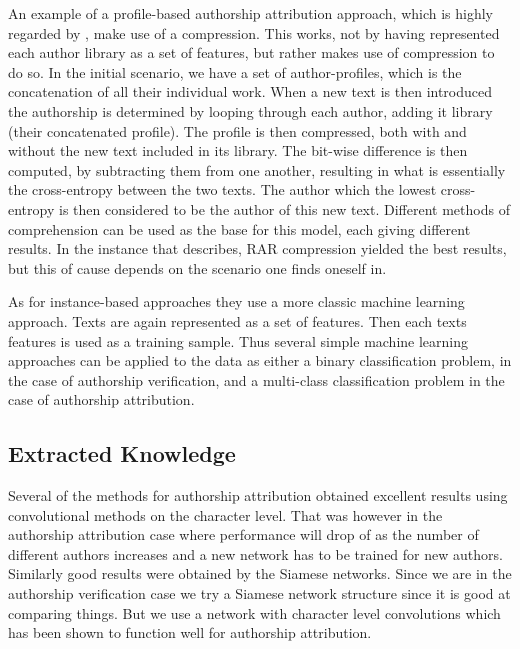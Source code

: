 An example of a profile-based authorship attribution approach, which is highly
regarded by \cite{stamatos2009}, make use of a compression. This works, not
by having represented each author library as a set of features, but rather
makes use of compression to do so. In the initial scenario, we have a set of
author-profiles, which is the concatenation of all their individual work.
When a new text is then introduced the authorship is determined by looping
through each author, adding it library (their concatenated profile). The
profile is then compressed, both with and without the new text included in its
library. The bit-wise difference is then computed, by subtracting them from
one another, resulting in what is essentially the cross-entropy between the
two texts. The author which the lowest cross-entropy is then considered to be
the author of this new text. Different methods of comprehension can be used as
the base for this model, each giving different results. In the instance that
\cite{stamatos2009} describes, RAR compression yielded the best results, but
this of cause depends on the scenario one finds oneself in.

As for instance-based approaches they use a more classic machine learning
approach. Texts are again represented as a set of features. Then each texts
features is used as a training sample. Thus several simple machine learning
approaches can be applied to the data as either a binary classification problem,
in the case of authorship verification, and a multi-class classification problem
in the case of authorship attribution.


\subsection{Extracted Knowledge}

Several of the methods for authorship attribution obtained excellent results
using convolutional methods on the character level. That was however in the
authorship attribution case where performance will drop of as the number of
different authors increases and a new network has to be trained for new authors.
Similarly good results were obtained by the Siamese networks. Since we are in
the authorship verification case we try a Siamese network structure since it is
good at comparing things. But we use a network with character level convolutions
which has been shown to function well for authorship attribution.
